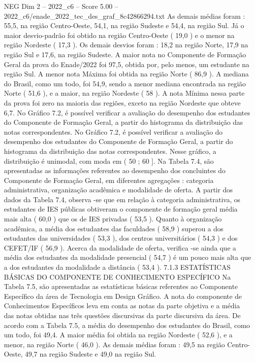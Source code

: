 \begin{textsample}{NEG Dim 2 – 2022\_c6 – Score 5.00 – 2022\_c6/enade\_2022\_tec\_des\_graf\_8c42866294.txt}
As demais médias foram : 55,5, na região Centro-Oeste, 54,1, na região Sudeste e 54,4, na região Sul.
Já o maior desvio-padrão foi obtido na região Centro-Oeste ( 19,0 ) e o menor na região Nordeste ( 17,3 ).
Os demais desvios foram : 18,2 na região Norte, 17,9 na região Sul e 17,6, na região Sudeste.
A maior nota no Componente de Formação Geral da prova do Enade/2022 foi 97,5, obtida por, pelo menos, um estudante na região Sul.
A menor nota Máxima foi obtida na região Norte ( 86,9 ).
A mediana do Brasil, como um todo, foi 54,9, sendo a menor mediana encontrada na região Norte ( 51,6 ), e a maior, na região Nordeste ( 58 ).
A nota Mínima nessa parte da prova foi zero na maioria das regiões, exceto na região Nordeste que obteve 6,7.
No Gráfico 7.2, é possível verificar a avaliação do desempenho dos estudantes do Componente de Formação Geral, a partir do histograma da distribuição das notas correspondentes.
No Gráfico 7.2, é possível verificar a avaliação do desempenho dos estudantes do Componente de Formação Geral, a partir do histograma da distribuição das notas correspondentes.
Nesse gráfico, a distribuição é unimodal, com moda em ( 50 ; 60 ].
Na Tabela 7.4, são apresentadas as informações referentes ao desempenho dos concluintes do Componente de Formação Geral, em diferentes agregações : categoria administrativa, organização acadêmica e modalidade de oferta.
A partir dos dados da Tabela 7.4, observa -se que em relação à categoria administrativa, os estudantes de IES públicas obtiveram o componente de formação geral média mais alta ( 60,0 ) que os de IES privadas ( 53,5 ).
Quanto à organização acadêmica, a média dos estudantes das faculdades ( 58,9 ) superou a dos estudantes das universidades ( 53,3 ), dos centros universitários ( 54,3 ) e dos CEFET/IF ( 56,9 ).
Acerca da modalidade de oferta, verifica -se ainda que a média dos estudantes da modalidade presencial ( 54,7 ) é um pouco mais alta que a dos estudantes da modalidade a distância ( 53,4 ). 7.1.3 ESTATÍSTICAS BÁSICAS DO COMPONENTE DE CONHECIMENTO ESPECÍFICO Na Tabela 7.5, são apresentadas as estatísticas básicas referentes ao Componente Específico da área de Tecnologia em Design Gráfico.
A nota do componente de Conhecimentos Específicos leva em conta as notas da parte objetiva e a média das notas obtidas nas três questões discursivas da parte discursiva da área.
De acordo com a Tabela 7.5, a média do desempenho dos estudantes do Brasil, como um todo, foi 49,4.
A maior média foi obtida na região Nordeste ( 52,6 ), e a menor, na região Norte ( 46,0 ).
As demais médias foram : 49,5 na região Centro-Oeste, 49,7 na região Sudeste e 49,0 na região Sul.

\end{textsample}
